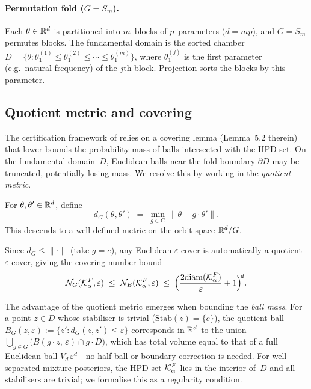 \paragraph{Permutation fold ($G = S_m$).}
Each $\theta \in \mathbb{R}^d$ is partitioned into $m$~blocks of $p$~parameters
($d = mp$), and $G = S_m$ permutes blocks.
The fundamental domain is the sorted chamber
$D = \{\theta : \theta^{(1)}_1 \leq \theta^{(2)}_1 \leq \cdots
\leq \theta^{(m)}_1\}$, where $\theta^{(j)}_1$ is the first parameter
(e.g.\ natural frequency) of the $j$th block.
Projection sorts the blocks by this parameter.


\subsection{Quotient metric and covering}
\label{sec:quotient_metric}

The certification framework of \citet{LCNF} relies on a covering
lemma (Lemma~5.2 therein) that lower-bounds the probability mass
of balls intersected with the HPD set.  On the fundamental domain~$D$,
Euclidean balls near the fold boundary $\partial D$ may be truncated,
potentially losing mass.  We resolve this by working in the
\emph{quotient metric}.

\begin{definition}\label{def:quotient_metric}
  For $\theta, \theta' \in \mathbb{R}^d$, define
  \begin{equation}\label{eq:d_G}
    d_G(\theta, \theta')
    \;=\; \min_{g \in G}\, \|\theta - g \cdot \theta'\|.
  \end{equation}
  This descends to a well-defined metric on the orbit space $\mathbb{R}^d/G$.
\end{definition}

\noindent
Since $d_G \leq \|\cdot\|$ (take $g = e$), any Euclidean
$\varepsilon$-cover is automatically a quotient $\varepsilon$-cover,
giving the covering-number bound
\begin{equation}\label{eq:covering_number}
  \mathcal{N}_G(\mathcal{K}_\alpha^F, \varepsilon)
  \;\leq\;
  \mathcal{N}_E(\mathcal{K}_\alpha^F, \varepsilon)
  \;\leq\;
  \Bigl(\frac{2\mathrm{diam}(\mathcal{K}_\alpha^F)}{\varepsilon} + 1\Bigr)^{\!d}.
\end{equation}

The advantage of the quotient metric emerges when bounding the
\emph{ball mass}.  For a point $z \in D$ whose stabiliser is trivial
($\mathrm{Stab}(z) = \{e\}$), the quotient ball
$B_G(z, \varepsilon) := \{z' : d_G(z, z') \leq \varepsilon\}$
corresponds in $\mathbb{R}^d$ to the union
$\bigcup_{g \in G}\bigl(B(g\!\cdot\!z,\,\varepsilon) \cap g\!\cdot\!D\bigr)$,
which has total volume equal to that of a full Euclidean ball
$V_d\,\varepsilon^d$---no half-ball or boundary correction is
needed.  For well-separated mixture posteriors, the HPD set
$\mathcal{K}_\alpha^F$ lies in the interior of~$D$ and all stabilisers are
trivial; we formalise this as a regularity condition.

